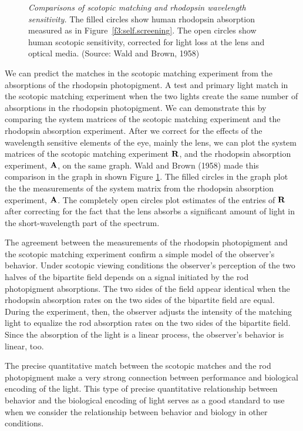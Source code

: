 \begin{figure}
\centerline {
}
\caption[Rhodopsin in the Eye]{
{\em Comparisons of scotopic matching and rhodopsin wavelength sensitivity.}
The filled circles show human rhodopsin absorption
measured as in Figure~\ref{f3:self.screening}.
The open circles show human scotopic sensitivity,
corrected for light loss at the lens and optical media.
(Source: Wald and Brown, 1958) 
%
%
}
\label{f3:rhodopsin.sens}
\end{figure}
We can predict the matches
in the scotopic matching experiment
from the absorptions of the rhodopsin photopigment.
A test and primary light match in the scotopic matching
experiment when the two lights
create the same number of absorptions in the rhodopsin photopigment.
We can demonstrate this by comparing the system matrices
of the scotopic matching experiment and the rhodopsin absorption
experiment.
After we correct for the effects of the wavelength sensitive elements 
of the eye, mainly the lens,
we can plot the system matrices of the scotopic matching experiment
$\mbox{$\bf R$}$, and the rhodopsin absorption experiment, $\mbox{$\bf A$}$,
on the same graph.
Wald and Brown (1958) made this comparison
in the graph in shown Figure \ref{f3:rhodopsin.sens}.
The filled circles in the graph
plot the the measurements of the
system matrix from the rhodopsin absorption experiment, $\mbox{$\bf A$}$.
The completely open circles plot estimates of the entries of
$\mbox{$\bf R$}$ after correcting
for the fact that the lens absorbs a significant amount of light
in the short-wavelength part of the spectrum.

The agreement between the measurements of the
rhodopsin photopigment and the scotopic matching
experiment confirm a simple model of
the observer's behavior.
Under scotopic viewing conditions the observer's perception
of the two halves of the bipartite field depends
on a signal initiated by the rod photopigment absorptions.
The two sides of the field appear identical when the 
rhodopsin absorption rates on the
two sides of the bipartite field are equal.
During the experiment, then,
the observer adjusts the intensity of the matching light
to equalize the rod absorption rates on the two sides of the bipartite field.
Since the absorption of the light 
is a linear process,
the observer's behavior is linear, too.

The precise quantitative match between the scotopic matches
and the rod photopigment make
a very strong connection between performance and biological
encoding of the light.
This type of precise
quantitative relationship between behavior and
the biological encoding of light serves
as a good standard to use when we consider the relationship
between behavior and biology in other conditions.

